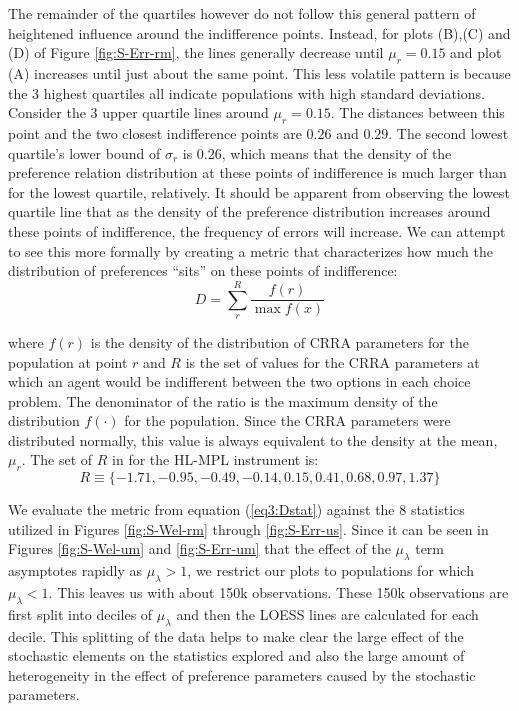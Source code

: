 \documentclass[../main.tex]{subfiles}
\begin{document}
The remainder of the quartiles however do not follow this general pattern of heightened influence around the indifference points.
Instead, for plots (B),(C) and (D) of Figure \ref{fig:S-Err-rm}, the lines generally decrease until $\mu_r = 0.15$ and plot (A) increases until just about the same point.
This less volatile pattern is because the 3 highest quartiles all indicate populations with high standard deviations.
Consider the 3 upper quartile lines around $\mu_r = 0.15$.
The distances between this point and the two closest indifference points are $0.26$ and $0.29$.
The second lowest quartile's lower bound of $\sigma_r$ is $0.26$, which means that the density of the preference relation distribution at these points of indifference is much larger than for the lowest quartile, relatively.
It should be apparent from observing the lowest quartile line that as the density of the preference distribution increases around these points of indifference, the frequency of errors will increase.
We can attempt to see this more formally by creating a metric that characterizes how much the distribution of preferences \enquote{sits} on these points of indifference:
\begin{equation}
	\label{eq3:Dstat}
	D = \sum_r^R \frac{f(r)}{\max f(x)}
\end{equation}

\noindent where $f(r)$ is the density of the distribution of CRRA parameters for the population at point $r$ and $R$ is the set of values for the CRRA parameters at which an agent would be indifferent between the two options in each choice problem.
The denominator of the ratio is the maximum density of the distribution $f(\cdot)$ for the population.
Since the CRRA parameters were distributed normally, this value is always equivalent to the density at the mean, $\mu_r$.
The set of $R$ in for the HL-MPL instrument is:
\begin{equation}
	R \equiv \{-1.71, -0.95, -0.49, -0.14, 0.15, 0.41, 0.68, 0.97, 1.37\}
\end{equation}

We evaluate the metric from equation (\ref{eq3:Dstat}) against the 8 statistics utilized in Figures \ref{fig:S-Wel-rm} through \ref{fig:S-Err-us}.
Since it can be seen in Figures \ref{fig:S-Wel-um} and \ref{fig:S-Err-um} that the effect of the $\mu_\lambda$ term asymptotes rapidly as $\mu_\lambda > 1$, we restrict our plots to populations for which $\mu_\lambda < 1$.
This leaves us with about 150k observations.
These 150k observations are first split into deciles of $\mu_\lambda$ and then the LOESS lines are calculated for each decile.
This splitting of the data helps to make clear the large effect of the stochastic elements on the statistics explored and also the large amount of heterogeneity in the effect of preference parameters caused by the stochastic parameters.
\end{document}
